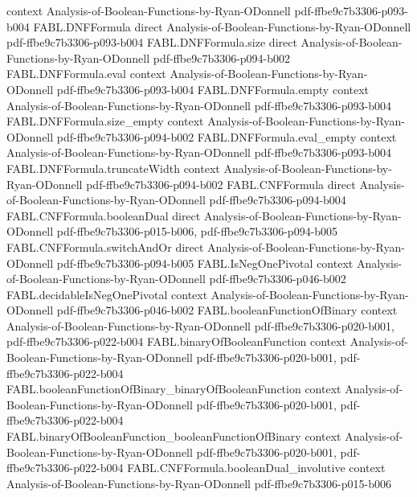 \begin{theorem}
  {context}
  {Analysis-of-Boolean-Functions-by-Ryan-ODonnell}
  {pdf-ffbe9c7b3306-p093-b004}
\proofstep
  {FABL.DNFFormula}
  {direct}
  {Analysis-of-Boolean-Functions-by-Ryan-ODonnell}
  {pdf-ffbe9c7b3306-p093-b004}
\proofstep
  {FABL.DNFFormula.size}
  {direct}
  {Analysis-of-Boolean-Functions-by-Ryan-ODonnell}
  {pdf-ffbe9c7b3306-p094-b002}
\proofstep
  {FABL.DNFFormula.eval}
  {context}
  {Analysis-of-Boolean-Functions-by-Ryan-ODonnell}
  {pdf-ffbe9c7b3306-p093-b004}
\proofstep
  {FABL.DNFFormula.empty}
  {context}
  {Analysis-of-Boolean-Functions-by-Ryan-ODonnell}
  {pdf-ffbe9c7b3306-p093-b004}
\proofstep
  {FABL.DNFFormula.size_empty}
  {context}
  {Analysis-of-Boolean-Functions-by-Ryan-ODonnell}
  {pdf-ffbe9c7b3306-p094-b002}
\proofstep
  {FABL.DNFFormula.eval_empty}
  {context}
  {Analysis-of-Boolean-Functions-by-Ryan-ODonnell}
  {pdf-ffbe9c7b3306-p093-b004}
\proofstep
  {FABL.DNFFormula.truncateWidth}
  {context}
  {Analysis-of-Boolean-Functions-by-Ryan-ODonnell}
  {pdf-ffbe9c7b3306-p094-b002}
\proofstep
  {FABL.CNFFormula}
  {direct}
  {Analysis-of-Boolean-Functions-by-Ryan-ODonnell}
  {pdf-ffbe9c7b3306-p094-b004}
\proofstep
  {FABL.CNFFormula.booleanDual}
  {direct}
  {Analysis-of-Boolean-Functions-by-Ryan-ODonnell}
  {pdf-ffbe9c7b3306-p015-b006,
    pdf-ffbe9c7b3306-p094-b005}
\proofstep
  {FABL.CNFFormula.switchAndOr}
  {direct}
  {Analysis-of-Boolean-Functions-by-Ryan-ODonnell}
  {pdf-ffbe9c7b3306-p094-b005}
\proofstep
  {FABL.IsNegOnePivotal}
  {context}
  {Analysis-of-Boolean-Functions-by-Ryan-ODonnell}
  {pdf-ffbe9c7b3306-p046-b002}
\proofstep
  {FABL.decidableIsNegOnePivotal}
  {context}
  {Analysis-of-Boolean-Functions-by-Ryan-ODonnell}
  {pdf-ffbe9c7b3306-p046-b002}
\proofstep
  {FABL.booleanFunctionOfBinary}
  {context}
  {Analysis-of-Boolean-Functions-by-Ryan-ODonnell}
  {pdf-ffbe9c7b3306-p020-b001,
    pdf-ffbe9c7b3306-p022-b004}
\proofstep
  {FABL.binaryOfBooleanFunction}
  {context}
  {Analysis-of-Boolean-Functions-by-Ryan-ODonnell}
  {pdf-ffbe9c7b3306-p020-b001,
    pdf-ffbe9c7b3306-p022-b004}
\proofstep
  {FABL.booleanFunctionOfBinary_binaryOfBooleanFunction}
  {context}
  {Analysis-of-Boolean-Functions-by-Ryan-ODonnell}
  {pdf-ffbe9c7b3306-p020-b001,
    pdf-ffbe9c7b3306-p022-b004}
\proofstep
  {FABL.binaryOfBooleanFunction_booleanFunctionOfBinary}
  {context}
  {Analysis-of-Boolean-Functions-by-Ryan-ODonnell}
  {pdf-ffbe9c7b3306-p020-b001,
    pdf-ffbe9c7b3306-p022-b004}
\proofstep
  {FABL.CNFFormula.booleanDual_involutive}
  {context}
  {Analysis-of-Boolean-Functions-by-Ryan-ODonnell}
  {pdf-ffbe9c7b3306-p015-b006}
\proofstep

\end{theorem}
